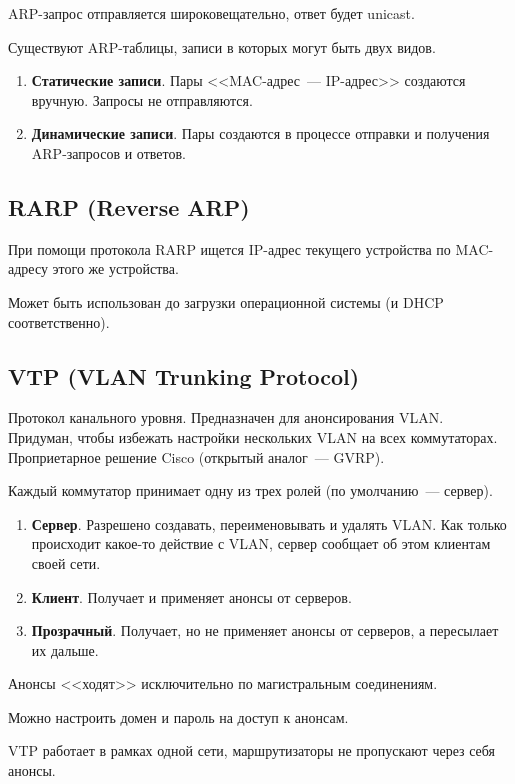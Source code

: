 ARP-запрос отправляется широковещательно, ответ будет unicast.

Существуют ARP-таблицы, записи в которых могут быть двух видов.

\begin{enumerate}
    \item \textbf{Статические записи}. Пары <<MAC-адрес~--- IP-адрес>> создаются вручную. Запросы не отправляются.
    \item \textbf{Динамические записи}. Пары создаются в процессе отправки и получения ARP-запросов и ответов.
\end{enumerate}

\subsection{RARP (Reverse ARP)}

При помощи протокола RARP ищется IP-адрес текущего устройства по MAC-адресу этого же устройства.

Может быть использован до загрузки операционной системы (и DHCP соответственно).

\subsection{VTP (VLAN Trunking Protocol)}

Протокол канального уровня. Предназначен для анонсирования VLAN. Придуман, чтобы избежать настройки нескольких VLAN на всех коммутаторах. Проприетарное решение Cisco (открытый аналог~--- GVRP).

Каждый коммутатор принимает одну из трех ролей (по умолчанию~--- сервер).

\begin{enumerate}
    \item \textbf{Сервер}. Разрешено создавать, переименовывать и удалять VLAN. Как только происходит какое-то действие с VLAN, сервер сообщает об этом клиентам своей сети.
    \item \textbf{Клиент}. Получает и применяет анонсы от серверов.
    \item \textbf{Прозрачный}. Получает, но не применяет анонсы от серверов, а пересылает их дальше.
\end{enumerate}

Анонсы <<ходят>> исключительно по магистральным соединениям.

Можно настроить домен и пароль на доступ к анонсам.

VTP работает в рамках одной сети, маршрутизаторы не пропускают через себя
анонсы.

